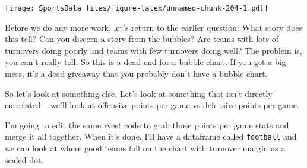 \documentclass[]{book}
\begin{document}
\texttt{[image: SportsData\_files/figure-latex/unnamed-chunk-204-1.pdf]}

Before we do any more work, let's return to the earlier question: What story does this tell? Can you discern a story from the bubbles? Are teams with lots of turnovers doing poorly and teams with few turnovers doing well? The problem is, you can't really tell. So this is a dead end for a bubble chart. If you get a big mess, it's a dead giveaway that you probably don't have a bubble chart.

So let's look at something else. Let's look at something that isn't directly correlated -- we'll look at offensive points per game vs defensive points per game.

I'm going to edit the same rvest code to grab those points per game stats and merge it all together. When it's done, I'll have a dataframe called \texttt{football} and we can look at where good teams fall on the chart with turnover margin as a scaled dot.
\end{document}
